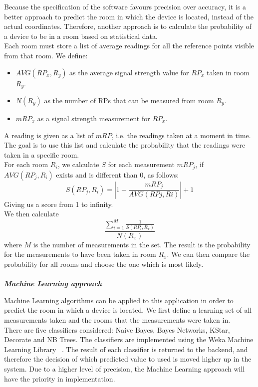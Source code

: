Because the specification of the software favours precision over accuracy, it is a better approach to predict the room in which the device is located, instead of the actual coordinates. Therefore, another approach is to calculate the probability of a device to be in a room based on statistical data.\\
Each room must store a list of average readings for all the reference points visible from that room. 
We define:\\
\begin{itemize}
\item $AVG(RP_x, R_y)$ as the average signal strength value for $RP_x$ taken in room $R_y$.
\item $N(R_y)$ as the number of RPs that can be measured from room $R_y$.
\item $mRP_x$ as a signal strength measurement for $RP_x$.
\end{itemize} 

A reading is given as a list of $mRP$, i.e. the readings taken at a moment in time. The goal is to use this list and calculate the probability that the readings were taken in a specific room.\\
For each room $R_i$, we calculate $S$ for each measurement $mRP_j$, if $AVG(RP_j, R_i)$ exists and is different than 0, as follows:
$$S(RP_j, R_i) = | 1 - \frac{mRP_j}{AVG(RPj, Ri)}|+1$$
Giving us a score from 1 to infinity.\\
We then calculate 
$$\frac{\displaystyle\sum_{i=1}^{M} \frac{1}{S(RP_i, R_x)}}{N(R_x)}$$
where $M$ is the number of measurements in the set.
The result is the probability for the measurements to have been taken in room $R_x$.
We can then compare the probability for all rooms and choose the one which is most likely.\\
\\
\textit{\textbf{Machine Learning approach}}

Machine Learning algorithms can be applied to this application in order to predict the room in which a device is located. We first define a learning set of all measurements taken and the rooms that the measurements were taken in.\\
There are five classifiers considered:
Naive Bayes, Bayes Networks, KStar, Decorate and NB Trees. The classifiers are implemented using the Weka Machine Learning Library ~\cite{Weka}. The result of each classifier is returned to the backend, and therefore the decision of which predicted value to used is moved higher up in the system.
Due to a higher level of precision, the Machine Learning approach will have the priority in implementation.


